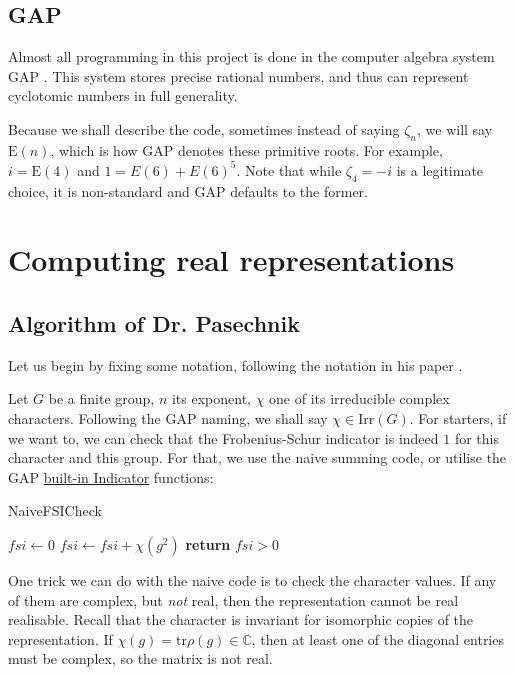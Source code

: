 \documentclass[11pt]{article}
\begin{document}
\subsection{GAP}

Almost all programming in this project is done in the computer algebra system GAP \cite{GAP4}.
This system stores precise rational numbers, and thus can represent cyclotomic numbers in full generality.

Because we shall describe the code, sometimes instead of saying $\zeta_n$, we will say $\text{E}(n)$,
which is how GAP denotes these primitive roots. For example, $i = \text{E}(4)$ and $1 = E(6) + E(6)^5$.
Note that while $\zeta_4 = -i$ is a legitimate choice, it is non-standard and GAP defaults to the former.

\newpage

\section{Computing real representations}

\subsection{Algorithm of Dr. Pasechnik}

Let us begin by fixing some notation, following the notation in his paper \cite{Pas21}.

Let $G$ be a finite group, $n$ its exponent, $\chi$ one of its irreducible complex characters. 
Following the GAP naming, we shall say $\chi \in \text{Irr}(G)$. For starters, if we want to,
we can check that the Frobenius-Schur indicator is indeed $1$ for this character and this group.
For that, we use the naive summing code, or utilise the GAP
\href{https://docs.gap-system.org/doc/ref/chap71_mj.html#X7FD3D3047DE6381E}{built-in Indicator} functions:

\begin{algorithm}
  \caption{NaiveFSICheck}
  \begin{algorithmic}
    \State $fsi \gets 0$
      \State $fsi \gets fsi + \chi(g^2)$
    \EndFor
    \State \textbf{return} $fsi > 0$
  \end{algorithmic}
\end{algorithm}

One trick we can do with the naive code is to check the character values. If any of them are
complex, but \textit{not} real, then the representation cannot be real realisable. Recall that
the character is invariant for isomorphic copies of the representation. If
$\chi(g) = \text{tr}\rho(g) \in \mathbb{C}$, then at least one of the diagonal entries
must be complex, so the matrix is not real.
\end{document}
